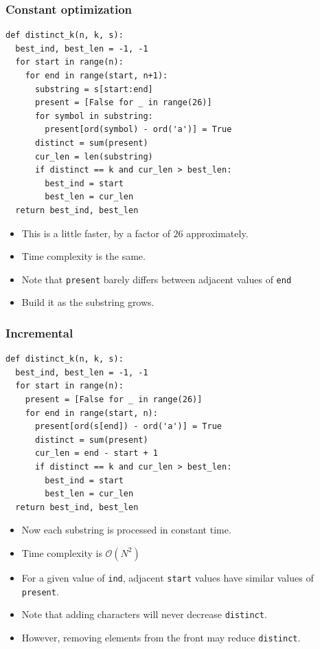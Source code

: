 \documentclass{beamer}
\begin{document}
\begin{frame}
    \frametitle{Constant optimization}
	\begin{tiny}
        \begin{verbatim}
def distinct_k(n, k, s):
  best_ind, best_len = -1, -1
  for start in range(n):
    for end in range(start, n+1):
      substring = s[start:end]
      present = [False for _ in range(26)]
      for symbol in substring:
        present[ord(symbol) - ord('a')] = True
      distinct = sum(present)
      cur_len = len(substring)
      if distinct == k and cur_len > best_len:
        best_ind = start
        best_len = cur_len
  return best_ind, best_len
        \end{verbatim}
    \end{tiny}
    \begin{itemize}
        \item<2-> This is a little faster, by a factor of $26$ approximately.
        \item<3-> Time complexity is the same.
        \item<4-> Note that \texttt{present} barely differs between adjacent values of \texttt{end}
        \item<5-> Build it as the substring grows.
    \end{itemize}
\end{frame}

\begin{frame}
    \frametitle{Incremental}
	\begin{tiny}
        \begin{verbatim}
def distinct_k(n, k, s):
  best_ind, best_len = -1, -1
  for start in range(n):
    present = [False for _ in range(26)]
    for end in range(start, n):
      present[ord(s[end]) - ord('a')] = True
      distinct = sum(present)
      cur_len = end - start + 1
      if distinct == k and cur_len > best_len:
        best_ind = start
        best_len = cur_len
  return best_ind, best_len
        \end{verbatim}
    \end{tiny}
    \begin{itemize}
        \item<1-> Now each substring is processed in constant time.
        \item<2-> Time complexity is $\mathcal{O}(N^2)$
        \item<3-> For a given value of \texttt{ind}, adjacent \texttt{start} values have similar values of \texttt{present}.
        \item<4-> Note that adding characters will never decrease \texttt{distinct}.
        \item<4-> However, removing elements from the front may reduce \texttt{distinct}.
    \end{itemize}
\end{frame}
\end{document}
